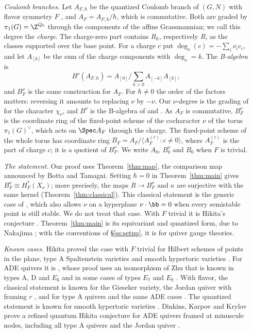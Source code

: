 \documentclass[11pt]{amsart}
\begin{document}
\emph{Coulomb branches.}  Let $A_{F,\hbar}$ be the quantized Coulomb branch
of $(G,N)$ with flavor symmetry $F$ \cite{BFN}, and $A_F=A_{F,\hbar}/\hbar$,
which is commutative.  Both are graded by $\pi_1(G)=\Z^{Q_0}$ through the
components of the affine Grassmannian; we call this degree the
\emph{charge}.  The charge-zero part contains $R_\hbar$, respectively $R$,
as the classes supported over the base point.  For a charge $c$ put
$\deg_\nu(c)=-\sum_i\nu_ic_i$, and let $A_{[k]}$ be the sum of the charge
components with $\deg_\nu=k$.  The \emph{B-algebra} is
\[
 B^\nu(A_{F,\hbar})=A_{[0]}\Big/\textstyle\sum_{k>0}A_{[-k]}A_{[k]},
\]
and $B^\nu_F$ is the same construction for $A_F$.  For $\hbar\neq0$ the
order of the factors matters: reversing it amounts to replacing $\nu$ by
$-\nu$.  Our $\nu$-degree is the grading of \cite[\S5.1.6]{hilburnBFNSpringer2023} for the
character $\chi_\nu$, and $B^\nu$ is the B-algebra of \cite[\S5.7]{hilburnBFNSpringer2023}
and \cite[\S3.5]{KTWWY}.  As $A_F$ is
commutative, $B^\nu_F$ is the
coordinate ring of the fixed-point scheme of the cocharacter $\nu$ of the
torus $\pi_1(G)^\vee$, which acts on $\Spec A_F$ through the charge.  The
fixed-point scheme of the whole torus has coordinate ring
$B_F=A_F/\langle A_F^{(c)}:c\neq0\rangle$, where $A_F^{(c)}$ is the part of
charge $c$; it is a quotient of $B^\nu_F$.  We write $A_0$, $B^\nu_0$ and $B_0$
when $F$ is trivial.


\emph{The statement.}  Our proof uses Theorem~\ref{thm:map}, the
comparison map announced by Botta and Tamagni.  Setting $\hbar=0$ in
Theorem~\ref{thm:main} gives $B^\nu_F\cong H^*_F(X_\nu)$; more precisely, the
maps $R\to B^\nu_F$ and $\kappa$ are surjective with the same kernel
(Theorem~\ref{thm:classical}).  This classical statement is the generic case
of , which also allows $\nu$ on a hyperplane $\nu\cdot\bb=0$
when every semistable point is still stable.  We do not treat that case.
With $F$ trivial it is Hikita's conjecture
\cite{hikitaAlgebroGeometricRealization2016}.  Theorem~\ref{thm:main} is its
equivariant and quantized form, due to Nakajima \cite[Conj.~8.9]{KTWWY}; with
the conventions of \S\ref{ss:setup}, it is
\cite[Conj.~5.26]{hilburnBFNSpringer2023} for quiver gauge theories.

\emph{Known cases.}  Hikita proved the case with $F$ trivial for Hilbert
schemes of points in the plane, type A Spaltenstein varieties and smooth
hypertoric varieties \cite{hikitaAlgebroGeometricRealization2016}.  For ADE quivers it is
\cite[Thm.~8.1]{KTWWY}, whose proof uses an isomorphism of Zhu that is
known in types A, D and $E_6$ and in some cases of types $E_7$ and $E_8$
\cite[Rem.~2.18, Cor.~2.17]{dumanskiKtheoreticHikita2025}.  With flavor, the classical statement is known for the
Gieseker variety, the Jordan quiver with framing $r$
\cite[Thm.~1.14]{krylovHikitaNakajimaConjecture2025}, and for type A quivers and the same ADE
cases \cite[Cors.~2.15, 2.17]{dumanskiKtheoreticHikita2025}.  The quantized statement is known for
smooth hypertoric varieties \cite[Thm.~1.2, Rem.~5.3]{kamnitzerQuantumHikita2021}.  Dinkins, Karpov
and Krylov prove a refined quantum Hikita conjecture for ADE quivers framed at
minuscule nodes, including all type A quivers and the Jordan quiver
\cite[Thm.~B]{dinkinsQuantumHikita2026}.
\end{document}
